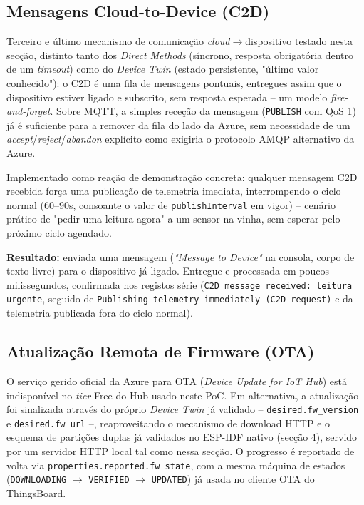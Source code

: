 \documentclass[a4paper,12pt]{article}
\begin{document}
\subsection{Mensagens Cloud-to-Device (C2D)}
Terceiro e último mecanismo de comunicação \textit{cloud}$\rightarrow$dispositivo testado nesta secção, distinto tanto dos \textit{Direct Methods} (síncrono, resposta obrigatória dentro de um \textit{timeout}) como do \textit{Device Twin} (estado persistente, "último valor conhecido"): o C2D é uma fila de mensagens pontuais, entregues assim que o dispositivo estiver ligado e subscrito, sem resposta esperada -- um modelo \textit{fire-and-forget}. Sobre MQTT, a simples receção da mensagem (\texttt{PUBLISH} com QoS 1) já é suficiente para a remover da fila do lado da Azure, sem necessidade de um \textit{accept}/\textit{reject}/\textit{abandon} explícito como exigiria o protocolo AMQP alternativo da Azure.

Implementado como reação de demonstração concreta: qualquer mensagem C2D recebida força uma publicação de telemetria imediata, interrompendo o ciclo normal (60--90s, consoante o valor de \texttt{publishInterval} em vigor) -- cenário prático de "pedir uma leitura agora" a um sensor na vinha, sem esperar pelo próximo ciclo agendado.

\textbf{Resultado:} enviada uma mensagem (\textit{"Message to Device"} na consola, corpo de texto livre) para o dispositivo já ligado. Entregue e processada em poucos milissegundos, confirmada nos registos série (\texttt{C2D message received: leitura urgente}, seguido de \texttt{Publishing telemetry immediately (C2D request)} e da telemetria publicada fora do ciclo normal).

\subsection{Atualização Remota de Firmware (OTA)}
O serviço gerido oficial da Azure para OTA (\textit{Device Update for IoT Hub}) está indisponível no \textit{tier} Free do Hub usado neste PoC. Em alternativa, a atualização foi sinalizada através do próprio \textit{Device Twin} já validado -- \texttt{desired.fw\_version} e \texttt{desired.fw\_url} --, reaproveitando o mecanismo de download HTTP e o esquema de partições duplas já validados no ESP-IDF nativo (secção 4), servido por um servidor HTTP local tal como nessa secção. O progresso é reportado de volta via \texttt{properties.reported.fw\_state}, com a mesma máquina de estados (\texttt{DOWNLOADING} $\rightarrow$ \texttt{VERIFIED} $\rightarrow$ \texttt{UPDATED}) já usada no cliente OTA do ThingsBoard.
\end{document}
